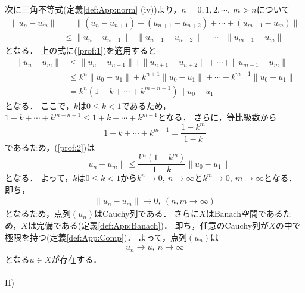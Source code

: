 \begin{Proof}[Banachの不動点定理]
次に三角不等式(定義\ref{def:App:norm} (iv))より，$n=0,1,2,\cdots, ~ m > n $について
\begin{align}
\| u_n - u_m \| &= \| (u_n - u_{n+1}) + (u_{n+1} - u_{n+2} ) + \cdots + ( u_{m-1} - u_m) \| \nonumber \\
&\le \| u_n - u_{n+1} \| + \| u_{n+1} - u_{n+2} \| + \cdots + \| u_{m-1} - u_m \|
\label{prof:3}
\end{align}
となる．
上の式に(\ref{prof:1})を適用すると
\begin{align}
\| u_n - u_m \| &\le \| u_n - u_{n+1} \| + \| u_{n+1} - u_{n+2} \| + \cdots + \| u_{m-1} - u_m \| \nonumber \\
&\le k^n \| u_0 - u_1 \| + k^{n+1} \| u_0 - u_1 \| + \cdots + k^{m-1} \| u_0 - u_1 \| \nonumber \\
&= k^n (1+k+\cdots+k^{m-n-1}) \| u_0 - u_1 \|
\label{prof:2}
\end{align}
となる．
ここで，$k$は$0 \le k < 1$であるため，$1+k+\cdots+k^{m-n-1} \le 1+k+\cdots+k^{m-1}$となる．
さらに，等比級数から
\begin{equation}
1+k+\cdots+k^{m-1} = \frac{1-k^m}{1-k}
\label{prof:5}
\end{equation}
であるため，(\ref{prof:2})は
\begin{equation}
\| u_n - u_m \| \le \frac{k^n(1-k^m)}{1-k}  \| u_0 - u_1 \|
\label{prof:4}
\end{equation}
となる．
よって，$k$は$0 \le k < 1$から$k^n \rightarrow 0, ~ n \rightarrow \infty$と$k^m \rightarrow 0, ~ m \rightarrow \infty$となる．
即ち，
\begin{align*}
\| u_n - u_m \| \rightarrow 0, ~ (n,m \rightarrow \infty )
\end{align*}
となるため，点列$(u_n)$はCauchy列である．
さらに$X$はBanach空間であるため，$X$は完備である(定義\ref{def:App:Banach})．
即ち，任意のCauchy列が$X$の中で極限を持つ(定義\ref{def:App:Comp})．
よって，点列$(u_n)$は
\begin{align*}
u_n \rightarrow u, ~ n \rightarrow \infty
\end{align*}
となる$u \in X$が存在する．\\
\\
II)


\end{Proof}
